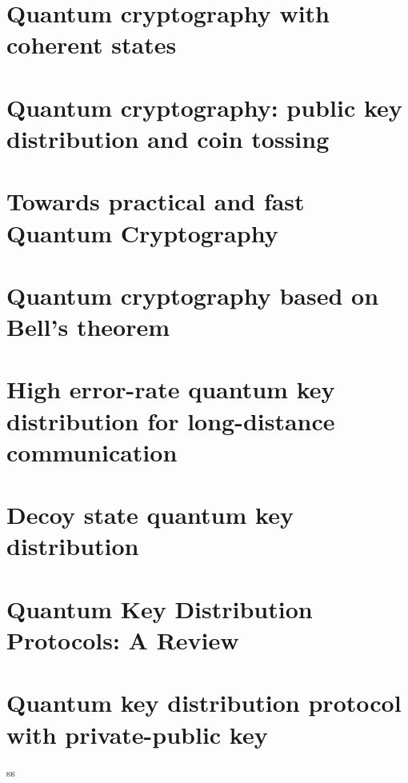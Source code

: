 

\newcommand{\trnas}{Translation}
\newcommand{\dic}{Dictionary}
\newcommand{\review}{Review}




\tableofcontents
\clearpage
\section{Quantum cryptography with coherent states}

%
\section{Quantum cryptography: public key distribution and coin tossing}



\section{Towards practical and fast Quantum Cryptography}



\section{Quantum cryptography based on Bell's theorem}



\section{High error-rate quantum key distribution for long-distance communication }



\section{Decoy state quantum key distribution}




\section{Quantum Key Distribution Protocols: A Review}



\section{Quantum key distribution protocol with private-public key}
ss
